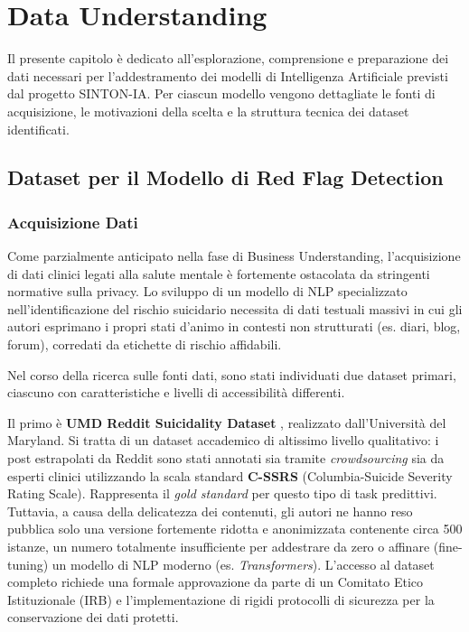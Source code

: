 \chapter{Data Understanding}
\label{ch:data_understanding}

Il presente capitolo è dedicato all'esplorazione, comprensione e preparazione dei dati necessari per l'addestramento dei modelli di Intelligenza Artificiale previsti dal progetto SINTON-IA. Per ciascun modello vengono dettagliate le fonti di acquisizione, le motivazioni della scelta e la struttura tecnica dei dataset identificati.

\section{Dataset per il Modello di Red Flag Detection}
\label{sec:data_red_flag}

\subsection{Acquisizione Dati}
\label{subsec:acquisizione_red_flag}

Come parzialmente anticipato nella fase di Business Understanding, l'acquisizione di dati clinici legati alla salute mentale è fortemente ostacolata da stringenti normative sulla privacy. Lo sviluppo di un modello di NLP specializzato nell'identificazione del rischio suicidario necessita di dati testuali massivi in cui gli autori esprimano i propri stati d'animo in contesti non strutturati (es. diari, blog, forum), corredati da etichette di rischio affidabili.

Nel corso della ricerca sulle fonti dati, sono stati individuati due dataset primari, ciascuno con caratteristiche e livelli di accessibilità differenti.

Il primo è \textbf{UMD Reddit Suicidality Dataset} \cite{umd_reddit_suicidality}, realizzato dall'Università del Maryland. Si tratta di un dataset accademico di altissimo livello qualitativo: i post estrapolati da Reddit sono stati annotati sia tramite \textit{crowdsourcing} sia da esperti clinici utilizzando la scala standard \textbf{C-SSRS} (Columbia-Suicide Severity Rating Scale). Rappresenta il \textit{gold standard} per questo tipo di task predittivi.
Tuttavia, a causa della delicatezza dei contenuti, gli autori ne hanno reso pubblica solo una versione fortemente ridotta e anonimizzata contenente circa 500 istanze, un numero totalmente insufficiente per addestrare da zero o affinare (fine-tuning) un modello di NLP moderno (es. \textit{Transformers}). L'accesso al dataset completo richiede una formale approvazione da parte di un Comitato Etico Istituzionale (IRB) e l'implementazione di rigidi protocolli di sicurezza per la conservazione dei dati protetti.

